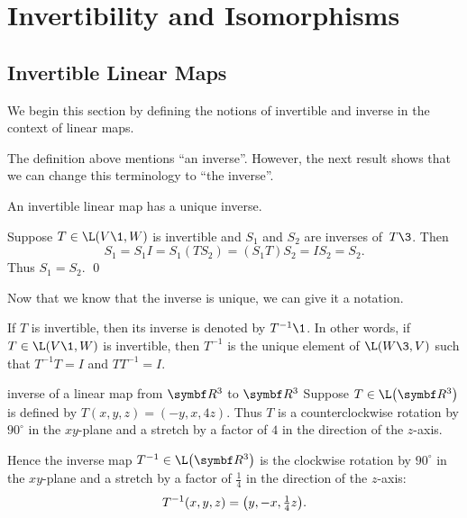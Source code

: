 \section{Invertibility and Isomorphisms} \label{invertible}

\subsection{Invertible Linear Maps}

We begin this section by defining the notions of invertible and inverse in the context of linear maps.


The definition above mentions ``an inverse''\!. However, the next result shows that we can change this terminology to ``the inverse''\!.

{An invertible linear map has a unique inverse.}

\proof
Suppose $T \in \L(V\1,W)$ is invertible and $S_1$ and $S_2$ are inverses of~$T\3$. Then
\[
S_1 = S_1I = S_1(TS_2) = (S_1T)S_2 = IS_2 = S_2.
\]
Thus $S_1 = S_2$. \qed

Now that we know that the inverse is unique, we can give it a notation.

{If $T$ is invertible, then its inverse is denoted by $T^{-1}\1$. In other words, if \mbox{$T \in \L(V\1,W)$} is invertible, then $T^{-1}$ is the unique element of $\L(W\3,V)$ such
that $T^{-1}T = I$ and $TT^{-1} = I$.}

\begin{example}{inverse of a linear map from\/ $\R3$ to\/ $\R3$}
Suppose $T \in \L\paren[\big]{ \R3 }$ is defined by
$
T(x, y, z) = (-y, x, 4z)$.
Thus $T$ is a counterclockwise rotation by $90^\circ$ in the $xy$-plane and a stretch by a factor of $4$ in the direction of the $z$-axis.

Hence the inverse map $T^{-1} \in \L\paren[\big]{ \R3 }$ is the clockwise rotation by $90^\circ$ in the $xy$-plane and a stretch by a factor of $\frac{1}{4}$ in the direction of the $z$-axis:
\[
T^{-1}(x, y, z) = \paren[\big]{y, -x, \tfrac{1}{4}z }.
\]
\exampledisplayend
\end{example}

